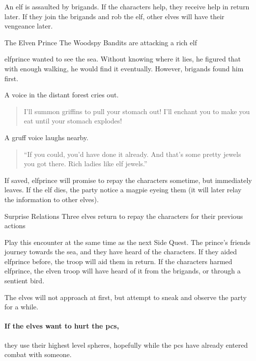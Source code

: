 \label{littleprince}

\noindent
An elf is assaulted by brigands.
If the characters help, they receive help in return later.
If they join the brigands and rob the elf, other elves will have their vengeance later.

{The Elven Prince}%
{The Woodspy Bandits are attacking a rich elf}%

\Gls{elfprince} wanted to see the sea.
Without knowing where it lies, he figured that with enough walking, he would find it eventually.
However, brigands found him first.

\begin{boxtext}
  A voice in the distant forest cries out.
  \begin{quote}
    I'll summon griffins to pull your stomach out!  I'll enchant you to make you eat until your stomach explodes!
  \end{quote}

  A gruff voice laughs nearby.

  \begin{quote}
    ``If you could, you'd have done it already.  And that's some pretty jewels you got there.  Rich ladies like elf jewels.''
  \end{quote}

\end{boxtext}


\elfprince

If saved, \gls{elfprince} will promise to repay the characters sometime, but immediately leaves.
If the elf dies, the party notice a magpie eyeing them (it will later relay the information to other elves).

{\squash Surprise Relations}%
{Three elves return to repay the characters for their previous actions}%

Play this encounter at the same time as the next Side Quest.
The prince's friends journey towards the sea, and they have heard of the characters.
If they aided \gls{elfprince} before, the troop will aid them in return.
If the characters harmed \gls{elfprince}, the elven troop will have heard of it from the brigands, or through a sentient bird.

The elves will not approach at first, but attempt to sneak and observe the party for a while.

\paragraph{If the elves want to hurt the \glspl{pc},}
they use their highest level spheres, hopefully while the \glspl{pc} have already entered combat with someone.

